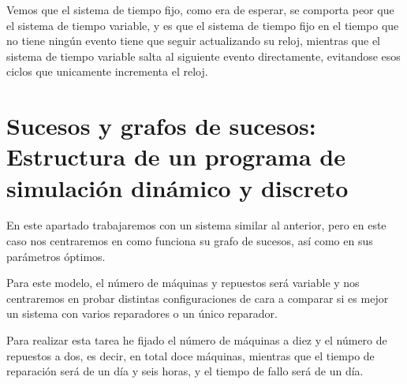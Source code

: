 \documentclass[12pt, spanish]{article}
\begin{document}
Vemos que el sistema de tiempo fijo, como era de esperar, se comporta peor que el sistema de tiempo variable, y es que el sistema de tiempo fijo en el tiempo que no tiene ningún evento tiene que seguir actualizando su reloj, mientras que el sistema de tiempo variable salta al siguiente evento directamente, evitandose esos ciclos que unicamente incrementa el reloj.


\section{Sucesos y grafos de sucesos: Estructura de un programa de simulación dinámico y discreto}

En este apartado trabajaremos con un sistema similar al anterior, pero en este caso nos centraremos en como funciona su grafo de sucesos, así como en sus parámetros óptimos.

Para este modelo, el número de máquinas y repuestos será variable y nos centraremos en probar distintas configuraciones de cara a comparar si es mejor un sistema con varios reparadores o un único reparador.


Para realizar esta tarea he fijado el número de máquinas a diez y el número de repuestos a dos, es decir, en total doce máquinas, mientras que el tiempo de reparación será de un día y seis horas, y el tiempo de fallo será de un día.
\end{document}
